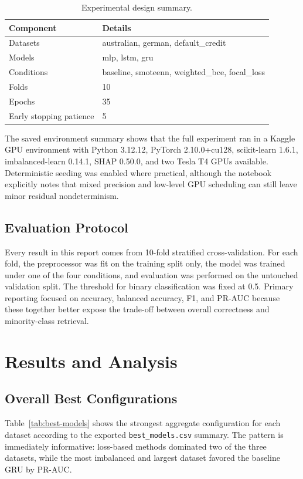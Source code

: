 \documentclass[11pt,a4paper]{article}
\begin{document}
\begin{table}[htbp]
\centering
\small
\caption{Experimental design summary.}
\label{tab:design-summary}
\begin{tabular}{ll}
\toprule
Component & Details \\
\midrule
Datasets & australian, german, default\_credit \\
Models & mlp, lstm, gru \\
Conditions & baseline, smoteenn, weighted\_bce, focal\_loss \\
Folds & 10 \\
Epochs & 35 \\
Early stopping patience & 5 \\
\bottomrule
\end{tabular}
\end{table}

The saved environment summary shows that the full experiment ran in a Kaggle GPU environment with Python 3.12.12, PyTorch 2.10.0+cu128, scikit-learn 1.6.1, imbalanced-learn 0.14.1, SHAP 0.50.0, and two Tesla T4 GPUs available. Deterministic seeding was enabled where practical, although the notebook explicitly notes that mixed precision and low-level GPU scheduling can still leave minor residual nondeterminism.

\subsection*{Evaluation Protocol}
Every result in this report comes from 10-fold stratified cross-validation. For each fold, the preprocessor was fit on the training split only, the model was trained under one of the four conditions, and evaluation was performed on the untouched validation split. The threshold for binary classification was fixed at 0.5. Primary reporting focused on accuracy, balanced accuracy, F1, and PR-AUC because these together better expose the trade-off between overall correctness and minority-class retrieval.

\section{Results and Analysis}
\subsection*{Overall Best Configurations}
Table~\ref{tab:best-models} shows the strongest aggregate configuration for each dataset according to the exported \texttt{best\_models.csv} summary. The pattern is immediately informative: loss-based methods dominated two of the three datasets, while the most imbalanced and largest dataset favored the baseline GRU by PR-AUC.
\end{document}
